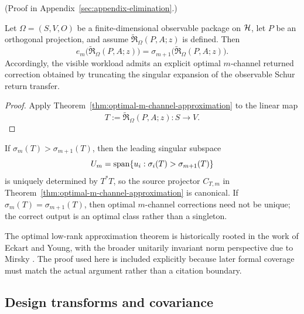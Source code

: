 (Proof in Appendix~\ref{sec:appendix-elimination}.)

\begin{corollary}
\label{cor:optimal-returned-correction-for-workload}
Let \(\Omega=(S,V,O)\) be a finite-dimensional observable package on \(\mathcal{H}\),
let \(P\) be an orthogonal projection, and assume
\(\widetilde{\mathfrak R}_{\Omega}(P,A;z)\) is defined. Then
\[
e_m\!\bigl(\widetilde{\mathfrak R}_{\Omega}(P,A;z)\bigr)
=
\sigma_{m+1}\!\bigl(\widetilde{\mathfrak R}_{\Omega}(P,A;z)\bigr).
\]
Accordingly, the visible workload admits an explicit optimal \(m\)-channel
returned correction obtained by truncating the singular expansion of the
observable Schur return transfer.
\end{corollary}

\begin{proof}
Apply Theorem~\ref{thm:optimal-m-channel-approximation} to the linear map
\[
T:=\widetilde{\mathfrak R}_{\Omega}(P,A;z):S\to V.
\]
\end{proof}

\begin{remark}
\label{rem:optimal-correction-gap}
If \(\sigma_m(T)>\sigma_{m+1}(T)\), then the leading singular subspace
\[
U_m=\mathrm{span}\{u_i:\sigma_i(T)>\sigma_{m+1}(T)\}
\]
is uniquely determined by \(T^\ast T\), so the source projector \(C_{T,m}\) in
Theorem~\ref{thm:optimal-m-channel-approximation} is canonical. If
\(\sigma_m(T)=\sigma_{m+1}(T)\), then optimal \(m\)-channel corrections need
not be unique; the correct output is an optimal class rather than a singleton.
\end{remark}

\begin{remark}
\label{rem:eckart-young-origin}
The optimal low-rank approximation theorem is historically rooted in the work
of Eckart and Young, with the broader unitarily invariant norm perspective due
to Mirsky \cite{EckartYoung1936,Mirsky1960}. The proof used here is included
explicitly because later formal coverage must match the actual argument rather
than a citation boundary.
\end{remark}

\subsection{Design transforms and covariance}

